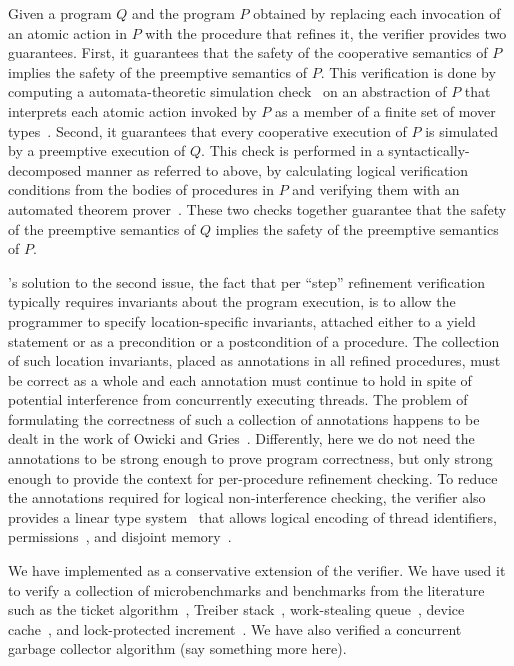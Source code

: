 Given a program $Q$ and the program $P$ obtained by replacing each invocation of an atomic action in $P$ 
with the procedure that refines it, the \civl verifier provides two guarantees.
First, it guarantees that the safety of the cooperative semantics of $P$ implies the safety of the preemptive semantics of $P$.
This verification is done by computing a automata-theoretic simulation check~\cite{HenzingerHK95} 
on an abstraction of $P$ that interprets each atomic action invoked by $P$ 
as a member of a finite set of mover types~\cite{Lipton75,FlanaganFLQ08}.
Second, it guarantees that every cooperative execution of $P$ is simulated by a preemptive execution of $Q$.
This check is performed in a syntactically-decomposed manner as referred to above, by calculating logical verification conditions from the bodies of procedures in $P$ and 
verifying them with an automated theorem prover~\cite{MouraB08}.
These two checks together guarantee that the 
safety of the preemptive semantics of $Q$ implies the safety of the preemptive semantics of $P$.

\civl's solution to the second issue, the fact that per ``step'' refinement verification typically requires invariants about the program execution, is to allow the programmer to specify location-specific invariants, attached either to a yield statement
or as a precondition or a postcondition of a procedure. 
The collection of such location invariants, placed as annotations in all refined procedures, must be correct as a whole and each  annotation must continue to hold in spite of potential interference from concurrently executing threads.
The problem of formulating the correctness of such a collection of annotations happens to be dealt in the work of Owicki and Gries~\cite{OwickiGries76}. Differently, here we do not need the annotations to be strong enough to prove program correctness, but only strong enough to provide the context for per-procedure refinement checking. 
To reduce the annotations required for logical non-interference checking, 
the \civl verifier also provides a linear type system~\cite{Wadler90lineartypes} 
that allows logical encoding of thread identifiers, permissions~\cite{boyland:03fractions}, 
and disjoint memory~\cite{LahiriQW11}.

We have implemented \civl as a conservative extension of the \boogie verifier.  
We have used it to verify a collection of microbenchmarks and benchmarks from the literature such as
the ticket algorithm~\cite{ticket}, Treiber stack~\cite{treiber}, work-stealing queue~\cite{wsq},
device cache~\cite{device-cache}, and lock-protected increment~\cite{incr}.
We have also verified a concurrent garbage collector algorithm (say something more here).


